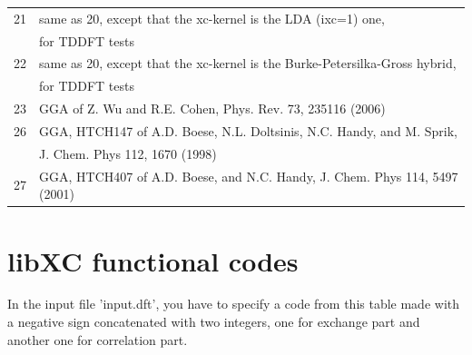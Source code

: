 \documentclass[a4paper,11pt]{report}
\begin{document}
\begin{longtable}{ll}
21 & same as 20, except that the xc-kernel is the LDA (ixc=1) one,\\
   & for TDDFT tests\\
22 & same as 20, except that the xc-kernel is the Burke-Petersilka-Gross hybrid,\\
   & for TDDFT tests\\
23 & GGA of Z. Wu and R.E. Cohen, Phys. Rev. 73, 235116 (2006)\\
26 & GGA, HTCH147 of A.D. Boese, N.L. Doltsinis, N.C. Handy, and M. Sprik,\\
   & J. Chem. Phys 112, 1670 (1998)\\
27 & GGA, HTCH407 of A.D. Boese, and N.C. Handy, J. Chem. Phys 114, 5497 (2001)\\
\end{longtable}

\chapter*{libXC functional codes}
\label{appendix-libXC}

In the input file 'input.dft', you have to specify a code from this table made with a negative sign
concatenated with two integers, one for exchange part and another one for correlation part.
\end{document}
